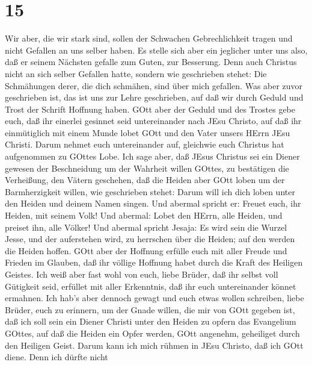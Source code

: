 \hypertarget{section-14}{%
\section{15}\label{section-14}}

 Wir aber, die wir stark sind, sollen der Schwachen
Gebrechlichkeit tragen und nicht Gefallen an uns selber haben.
 Es stelle sich aber ein jeglicher unter uns also, daß er
seinem Nächsten gefalle zum Guten, zur Besserung.  Denn auch
Christus nicht an sich selber Gefallen hatte, sondern wie geschrieben
stehet: Die Schmähungen derer, die dich schmähen, sind über mich
gefallen.  Was aber zuvor geschrieben ist, das ist uns zur
Lehre geschrieben, auf daß wir durch Geduld und Trost der Schrift
Hoffnung haben.  GOtt aber der Geduld und des Trostes gebe
euch, daß ihr einerlei gesinnet seid untereinander nach JEsu Christo,
 auf daß ihr einmütiglich mit einem Munde lobet GOtt und den
Vater unsers HErrn JEsu Christi.  Darum nehmet euch
untereinander auf, gleichwie euch Christus hat aufgenommen zu GOttes
Lobe.  Ich sage aber, daß JEsus Christus sei ein Diener
gewesen der Beschneidung um der Wahrheit willen GOttes, zu bestätigen
die Verheißung, den Vätern geschehen,  daß die Heiden aber
GOtt loben um der Barmherzigkeit willen, wie geschrieben stehet: Darum
will ich dich loben unter den Heiden und deinem Namen singen.
 Und abermal spricht er: Freuet euch, ihr Heiden, mit
seinem Volk!  Und abermal: Lobet den HErrn, alle Heiden,
und preiset ihn, alle Völker!  Und abermal spricht Jesaja:
Es wird sein die Wurzel Jesse, und der auferstehen wird, zu herrschen
über die Heiden; auf den werden die Heiden hoffen.  GOtt
aber der Hoffnung erfülle euch mit aller Freude und Frieden im Glauben,
daß ihr völlige Hoffnung habet durch die Kraft des Heiligen Geistes.
 Ich weiß aber fast wohl von euch, liebe Brüder, daß ihr
selbst voll Gütigkeit seid, erfüllet mit aller Erkenntnis, daß ihr euch
untereinander könnet ermahnen.  Ich hab's aber dennoch
gewagt und euch etwas wollen schreiben, liebe Brüder, euch zu erinnern,
um der Gnade willen, die mir von GOtt gegeben ist,  daß ich
soll sein ein Diener Christi unter den Heiden zu opfern das Evangelium
GOttes, auf daß die Heiden ein Opfer werden, GOtt angenehm, geheiliget
durch den Heiligen Geist.  Darum kann ich mich rühmen in
JEsu Christo, daß ich GOtt diene.  Denn ich dürfte nicht
